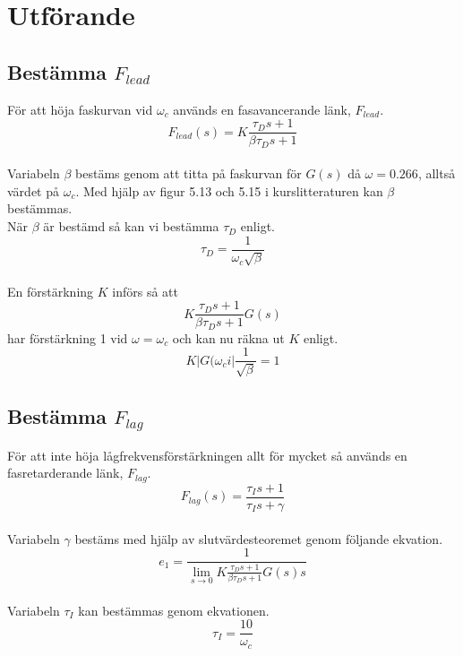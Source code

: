 \documentclass[a4paper]{article}
\begin{document}
\section{Utförande}



\subsection{Bestämma $F_{lead}$}

För att höja faskurvan vid $\omega_{c}$ används en fasavancerande länk, $F_{lead}$.
\\
\begin{equation}
  F_{lead}(s)=K\frac{\tau_{D}s+1}{\beta\tau_{D}s+1}
\end{equation}
\\
Variabeln $\beta$ bestäms genom att titta på faskurvan för $G(s)$ då $\omega = 0.266$, alltså värdet på $\omega_c$. 
Med hjälp av figur 5.13 och 5.15 i kurslitteraturen \cite{kb} kan $\beta$ bestämmas.
\\
När $\beta$ är bestämd så kan vi bestämma $\tau_D$ enligt.
\\
\begin{equation}
  \tau_D=\frac{1}{\omega_c\sqrt{\beta}}
\end{equation}
\\
En förstärkning $K$ införs så att 
\\
\begin{equation}
  K\frac{\tau_Ds+1}{\beta\tau_Ds+1}G(s)
\end{equation}
har förstärkning 1 vid $\omega = \omega_c$ och kan nu räkna ut $K$ enligt.
\\
\begin{equation}
  K|G(\omega_ci|\frac{1}{\sqrt{\beta}}=1
\end{equation}

\subsection{Bestämma $F_{lag}$}

För att inte höja lågfrekvensförstärkningen allt för mycket så används en fasretarderande länk, $F_{lag}$.
\\
\begin{equation}
  F_{lag}(s)=\frac{\tau_Is+1}{\tau_Is+\gamma}
\end{equation}
\\
Variabeln $\gamma$ bestäms med hjälp av slutvärdesteoremet genom följande ekvation.
\\
\begin{equation}
  e_1=\frac{1}{\lim_{s \to 0}K\frac{\tau_Ds+1}{\beta\tau_Ds+1}G(s)s}
\end{equation}
\\
Variabeln $\tau_I$ kan bestämmas genom ekvationen.
\\
\begin{equation}
  \tau_I=\frac{10}{\omega_c}
\end{equation}
\end{document}
